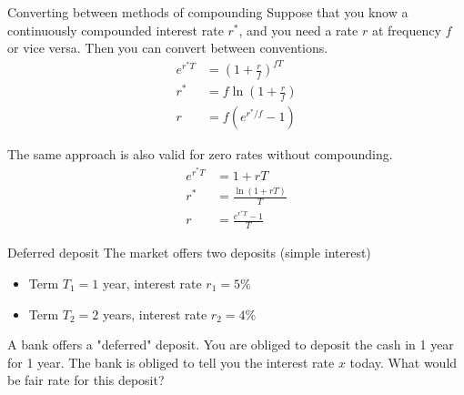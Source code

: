 \documentclass{beamer}
\begin{document}
\begin{frame}{Converting between methods of compounding}
\justify
Suppose that you know a continuously compounded interest rate $r^*$, and you need a rate $r$ at frequency $f$ or vice versa. Then you can convert between conventions.
\begin{align*}
e^{r^*T} &= \left(1 + \frac{r}{f}\right)^{fT} \\
r^* &= f\ln \left(1 + \frac{r}{f}\right) \\
r &= f\left(e^{r^*/f} - 1\right)
\end{align*}

\justify
The same approach is also valid for zero rates without compounding.
\begin{align*}
e^{r^*T} &= 1+rT \\
r^* &= \frac{\ln(1+rT)}{T} \\
r &= \frac{e^{r^*T}-1}{T}
\end{align*}

\end{frame}



\begin{frame}{Deferred deposit}
\justify
The market offers two deposits (simple interest)
\begin{itemize}
\item Term $T_1=1$ year, interest rate $r_1=5\%$ 
\item Term $T_2=2$ years, interest rate $r_2=4\%$ 
\end{itemize}

A bank offers a  "deferred" deposit. You are obliged to deposit the cash in 1 year for 1 year. The bank is obliged to tell you the interest rate $x$ today. What would be fair rate for this deposit?

\centering
{}
\end{frame}
\end{document}
